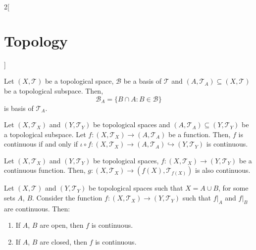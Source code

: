 \documentclass[../../../main.tex]{subfiles}
\begin{document}
\begin{multicols}{2}[\section{Topology}]
\begin{prop}
    Let $(X,\mathcal{T})$ be a topological space, $\mathcal{B}$ be a basis of $\mathcal{T}$ and $(A,\mathcal{T}_A)\subseteq (X,\mathcal{T})$ be a topological subspace. Then, $$\mathcal{B}_A=\{B\cap A:B\in\mathcal{B}\}$$ is basis of $\mathcal{T}_A$.
  \end{prop}
  \begin{prop}
    Let $(X,\mathcal{T}_X)$ and $(Y,\mathcal{T}_Y)$ be topological spaces and $(A,\mathcal{T}_A)\subseteq (Y,\mathcal{T}_Y)$ be a topological subspace. Let $f:(X,\mathcal{T}_X)\rightarrow (A,\mathcal{T}_A)$ be a function. Then, $f$ is continuous if and only if $\iota\circ f:(X,\mathcal{T}_X)\rightarrow (A,\mathcal{T}_A)\hookrightarrow (Y,\mathcal{T}_Y)$ is continuous.
  \end{prop}
  \begin{corollary}
    Let $(X,\mathcal{T}_X)$ and $(Y,\mathcal{T}_Y)$ be topological spaces, $f:(X,\mathcal{T}_X)\rightarrow (Y,\mathcal{T}_Y)$ be a continuous function. Then, $g:(X,\mathcal{T}_X)\rightarrow (f(X),\mathcal{T}_{f(X)})$ is also continuous.
  \end{corollary}
  \begin{prop}
    Let $(X,\mathcal{T})$ and $(Y,\mathcal{T}_Y)$ be topological spaces such that $X=A\cup B$, for some sets $A$, $B$. Consider the function $f:(X,\mathcal{T}_X)\rightarrow (Y,\mathcal{T}_Y)$ such that $f|_A$ and $f|_B$ are continuous. Then:
    \begin{enumerate}
      \item If $A$, $B$ are open, then $f$ is continuous.
      \item If $A$, $B$ are closed, then $f$ is continuous.
    \end{enumerate}
  \end{prop}

\end{multicols}
\end{document}
